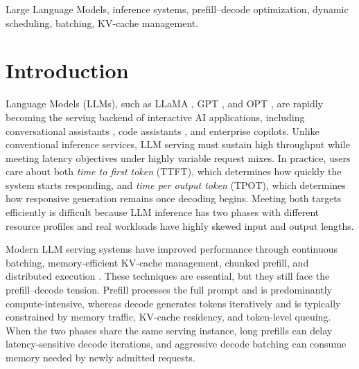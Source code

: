 \documentclass[lettersize,journal]{IEEEtran}
\begin{document}
\begin{IEEEkeywords}
Large Language Models, inference systems, prefill--decode optimization, dynamic scheduling, batching, KV-cache management.
\end{IEEEkeywords}















\section{Introduction}
 Language Models (LLMs), such as LLaMA \cite{b1}, GPT \cite{b2}, and OPT \cite{b3}, are rapidly becoming the serving backend of interactive AI applications, including conversational assistants \cite{b11,b12}, code assistants \cite{b14}, and enterprise copilots. Unlike conventional inference services, LLM serving must sustain high throughput while meeting latency objectives under highly variable request mixes. In practice, users care about both \emph{time to first token} (TTFT), which determines how quickly the system starts responding, and \emph{time per output token} (TPOT), which determines how responsive generation remains once decoding begins. Meeting both targets efficiently is difficult because LLM inference has two phases with different resource profiles and real workloads have highly skewed input and output lengths.

Modern LLM serving systems have improved performance through continuous batching, memory-efficient KV-cache management, chunked prefill, and distributed execution \cite{orca,vllm,sarathi,tensorrt,flexgen,alpaserve}. These techniques are essential, but they still face the prefill--decode tension. Prefill processes the full prompt and is predominantly compute-intensive, whereas decode generates tokens iteratively and is typically constrained by memory traffic, KV-cache residency, and token-level queuing. When the two phases share the same serving instance, long prefills can delay latency-sensitive decode iterations, and aggressive decode batching can consume memory needed by newly admitted requests.
\end{document}

